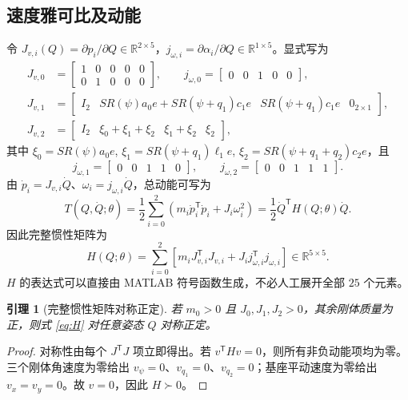 \documentclass[journal,onecolumn]{IEEEtran}
\newtheorem{lemma}{引理}[section]
\newcommand{\R}{\mathbb R}
\newcommand{\tr}{\mathsf T}
\begin{document}
\subsection{速度雅可比及动能}
令 $J_{v,i}(Q)=\partial p_i/\partial Q\in\R^{2\times5}$，$j_{\omega,i}=\partial\alpha_i/\partial Q\in\R^{1\times5}$。显式写为
\begin{align}
 J_{v,0}&=\begin{bmatrix}1&0&0&0&0\\0&1&0&0&0\end{bmatrix},\qquad j_{\omega,0}=\begin{bmatrix}0&0&1&0&0\end{bmatrix},\\
 J_{v,1}&=\begin{bmatrix}I_2& S R(\psi)a_0e+S R(\psi+q_1)c_1e&S R(\psi+q_1)c_1e&0_{2\times1}\end{bmatrix},\\
 J_{v,2}&=\begin{bmatrix}I_2& \xi_0+\xi_1+\xi_2&\xi_1+\xi_2&\xi_2\end{bmatrix},
\end{align}
其中 $\xi_0=SR(\psi)a_0e$, $\xi_1=SR(\psi+q_1)\ell_1e$, $\xi_2=SR(\psi+q_1+q_2)c_2e$，且
\begin{equation}
 j_{\omega,1}=\begin{bmatrix}0&0&1&1&0\end{bmatrix},\qquad
 j_{\omega,2}=\begin{bmatrix}0&0&1&1&1\end{bmatrix}.
\end{equation}
由 $\dot p_i=J_{v,i}\dot Q$、$\omega_i=j_{\omega,i}\dot Q$，总动能可写为
\begin{equation}
 T(Q,\dot Q;\theta)=\frac12\sum_{i=0}^2\left(m_i\dot p_i^\tr\dot p_i+J_i\omega_i^2\right)=\frac12\dot Q^\tr H(Q;\theta)\dot Q.
 \label{eq:T}
\end{equation}
因此完整惯性矩阵为
\begin{equation}
 \boxed{H(Q;\theta)=\sum_{i=0}^2\left[m_iJ_{v,i}^\tr J_{v,i}+J_i j_{\omega,i}^\tr j_{\omega,i}\right]\in\R^{5\times5}.}
 \label{eq:H}
\end{equation}
$H$ 的表达式可以直接由 MATLAB 符号函数生成，不必人工展开全部 $25$ 个元素。

\begin{lemma}[完整惯性矩阵对称正定]
若 $m_0>0$ 且 $J_0,J_1,J_2>0$，其余刚体质量为正，则式 \eqref{eq:H} 对任意姿态 $Q$ 对称正定。
\end{lemma}
\begin{proof}
对称性由每个 $J^\tr J$ 项立即得出。若 $v^\tr Hv=0$，则所有非负动能项均为零。三个刚体角速度为零给出 $v_\psi=0$、$v_{q_1}=0$、$v_{q_2}=0$；基座平动速度为零给出 $v_x=v_y=0$。故 $v=0$，因此 $H\succ0$。
\end{proof}
\end{document}
